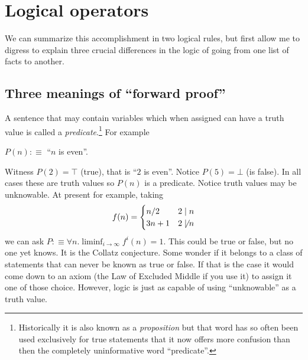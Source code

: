 \section{Logical operators}

We can summarize this accomplishment in two logical rules, but first allow 
me to digress to explain three crucial differences in the logic of going from 
one list of facts to another.

\subsection{Three meanings of ``forward proof''}
 A sentence that may contain variables which when 
assigned can have a truth value is called a \emph{predicate}.\footnote{Historically it 
is also known as a \emph{proposition} but that word has so often been used exclusively 
for true statements that it now offers more confusion than then the completely uninformative word ``predicate''.}  
For example 
\begin{center}
    $P(n):\equiv$ ``$n$ is even''.
\end{center}
Witness $P(2)=\top$ (true), that is ``$2$ is even''.  
Notice $P(5)=\bot$ (is false).  In all cases these are truth values
so $P(n)$ is a predicate.  Notice truth values may be unknowable.
At present for example, taking 
\[ 
    f(n) =\begin{cases} n/2 & 2\mid n\\ 3n+1 & 2\not\mid n \end{cases}
\]
we can ask $P:\equiv \forall n.\liminf_{i\to \infty}f^i(n)=1$.
This could be true or false, but no one yet knows.  It is the Collatz conjecture.
Some wonder if it belongs to a class of statements that can never be known
as true or false.  If that is the case it would come down to an axiom 
(the Law of Excluded Middle if you use it) to assign it one of those choice.
However, logic is just as capable of using ``unknowable'' as a truth value.

